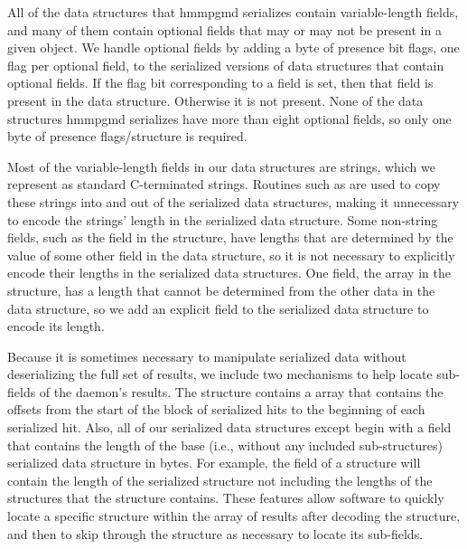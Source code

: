 \documentclass[notoc,justified]{tufte-book}    %
\begin{document}
All of the data structures that hmmpgmd serializes contain variable-length fields, and many of them contain optional fields that may or may not be present in a given object.  We handle optional fields by adding a byte of presence bit flags, one flag per optional field, to the serialized versions of data structures that contain optional fields.  If the flag bit corresponding to a field is set, then that field is present in the data structure. Otherwise it is not present.  None of the data structures hmmpgmd serializes have more than eight optional fields, so only one byte of presence flags/structure is required.

Most of the variable-length fields in our data structures are strings, which we represent as standard C-terminated strings.  Routines such as  are used to copy these strings into and out of the serialized data structures, making it unnecessary to encode the strings' length in the serialized data structure.  Some non-string fields, such as the  field in the {} structure, have lengths that are determined by the value of some other field in the data structure, so it is not necessary to explicitly encode their lengths in the serialized data structures. One field, the  array in the {} structure, has a length that cannot be determined from the other data in the data structure, so we add an explicit field to the serialized data structure to encode its length.

Because it is sometimes necessary to manipulate serialized data without deserializing the full set of results, we include two mechanisms to help locate sub-fields of the daemon's results.  The {} structure contains a  array that contains the offsets from the start of the block of serialized hits to the beginning of each serialized hit.  Also, all of our serialized data structures except {} begin with a  field that contains the length of the base (i.e., without any included sub-structures) serialized data structure in bytes.  For example, the  field of a {} structure will contain the length of the serialized {} structure not including the lengths of the {} structures that the {} structure contains.  These features allow software to quickly locate a specific {} structure within the array of results after decoding the {} structure, and then to skip through the {} structure as necessary to locate its sub-fields.
\end{document}
